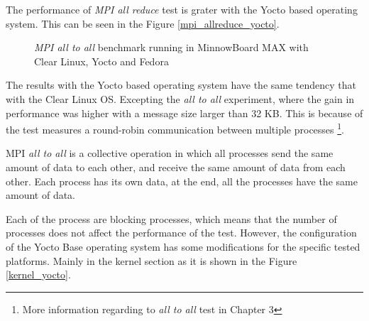 The performance of \textit{MPI all reduce} test is grater with the Yocto based
operating system. This can be seen in the Figure \ref{mpi_allreduce_yocto}.

\begin{figure}[H]
\begin{center}
\end{center}
\caption{\textit{MPI all to all} benchmark running in  MinnowBoard MAX with Clear Linux, Yocto
and Fedora}
\label{mpi_all_to_all_yocto}
\end{figure}

The results with the Yocto based operating system have the same
tendency that with the Clear Linux OS. Excepting  the \textit{all to all}
experiment, where the gain in performance was higher with a message size
larger than 32 KB. This is because of the test measures a round-robin communication 
between multiple processes \footnote{More information regarding to \textit{all
to all} test in Chapter 3}.

MPI \textit{all to all} is a collective operation in which all processes send
the same amount of data to each other, and receive the same amount of data from
each other. Each process has its own data, at the end, all the processes have
the same amount of data. 

Each of the process are blocking processes, which means that the number of
processes does not affect the performance of the test. However,
the configuration of the Yocto Base operating system has 
some modifications for the specific tested platforms. Mainly in the
kernel section as it is shown in the Figure \ref{kernel_yocto}.

\begin{minipage}{\textwidth}
\end{minipage}

